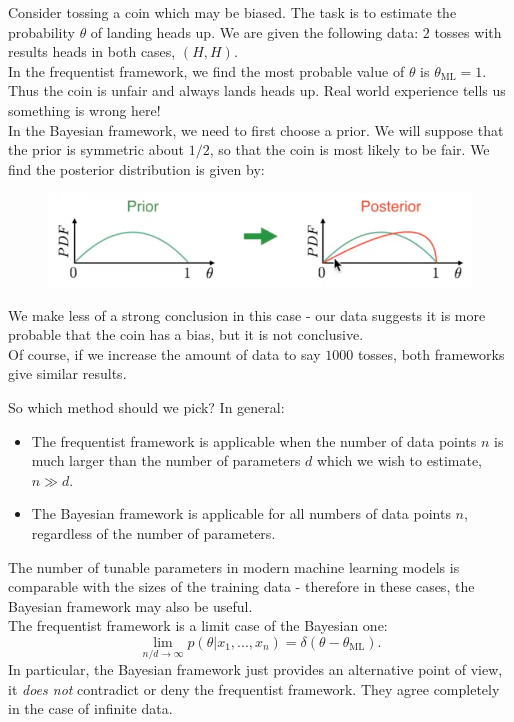 \newpage
\begin{frameex}
Consider tossing a coin which may be biased. The task is to estimate the probability $\theta$ of landing heads up. We are given the following data: $2$ tosses with results heads in both cases, $(H,H)$.\\

In the frequentist framework, we find the most probable value of $\theta$ is $\theta_{\text{ML}} = 1$. Thus the coin is unfair and always lands heads up. Real world experience tells us something is wrong here!\\

In the Bayesian framework, we need to first choose a prior. We will suppose that the prior is symmetric about $1/2$, so that the coin is most likely to be fair. We find the posterior distribution is given by:
\begin{figure}[H]
\centering
\includegraphics[scale=0.4]{bayesianinference.png}
\end{figure}
We make less of a strong conclusion in this case - our data suggests it is more probable that the coin has a bias, but it is not conclusive.\\

Of course, if we increase the amount of data to say $1000$ tosses, both frameworks give similar results. 
\end{frameex}

So which method should we pick? In general:
\begin{itemize}
\item The frequentist framework is applicable when the number of data points $n$ is much larger than the number of parameters $d$ which we wish to estimate, $n \gg d$. 
\item The Bayesian framework is applicable for all numbers of data points $n$, regardless of the number of parameters.
\end{itemize}
The number of tunable parameters in modern machine learning models is comparable with the sizes of the training data - therefore in these cases, the Bayesian framework may also be useful. \\

The frequentist framework is a limit case of the Bayesian one:
\begin{equation*}
\lim_{n/d \rightarrow \infty} p(\theta|x_1,...,x_n) = \delta(\theta - \theta_{\text{ML}}). 
\end{equation*}
In particular, the Bayesian framework just provides an alternative point of view, it \textit{does not} contradict or deny the frequentist framework. They agree completely in the case of infinite data.\\

